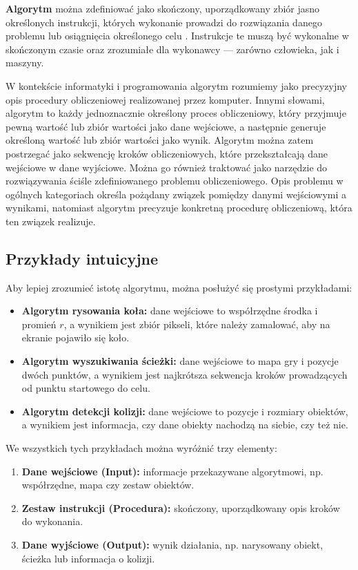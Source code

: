 \documentclass[a4paper,12pt]{book} %
\begin{document}
\textbf{Algorytm} można zdefiniować jako skończony, uporządkowany zbiór jasno określonych instrukcji, których wykonanie prowadzi do rozwiązania danego problemu lub osiągnięcia określonego celu \cite{Algorithms_introduction}. Instrukcje te muszą być wykonalne w skończonym czasie oraz zrozumiałe dla wykonawcy — zarówno człowieka, jak i maszyny.

W kontekście informatyki i programowania algorytm rozumiemy jako precyzyjny opis procedury obliczeniowej realizowanej przez komputer.
Innymi słowami, algorytm to każdy jednoznacznie określony proces obliczeniowy, który przyjmuje pewną wartość lub zbiór wartości jako dane wejściowe, a następnie generuje określoną wartość lub zbiór wartości jako wynik. Algorytm można zatem postrzegać jako sekwencję kroków obliczeniowych, które przekształcają dane wejściowe w dane wyjściowe.
Można go również traktować jako narzędzie do rozwiązywania ściśle zdefiniowanego problemu obliczeniowego. Opis problemu w ogólnych kategoriach określa pożądany związek pomiędzy danymi wejściowymi a wynikami, natomiast algorytm precyzuje konkretną procedurę obliczeniową, która ten związek realizuje.

\subsection*{Przykłady intuicyjne}

Aby lepiej zrozumieć istotę algorytmu, można posłużyć się prostymi przykładami:

\begin{itemize}
    \item \textbf{Algorytm rysowania koła:} dane wejściowe to współrzędne środka i promień $r$, a wynikiem jest zbiór pikseli, które należy zamalować, aby na ekranie pojawiło się koło.
    \item \textbf{Algorytm wyszukiwania ścieżki:} dane wejściowe to mapa gry i pozycje dwóch punktów, a wynikiem jest najkrótsza sekwencja kroków prowadzących od punktu startowego do celu.
    \item \textbf{Algorytm detekcji kolizji:} dane wejściowe to pozycje i rozmiary obiektów, a wynikiem jest informacja, czy dane obiekty nachodzą na siebie, czy też nie.
\end{itemize}

We wszystkich tych przykładach można wyróżnić trzy elementy:
\begin{enumerate}
    \item \textbf{Dane wejściowe (Input):} informacje przekazywane algorytmowi, np. współrzędne, mapa czy zestaw obiektów.
    \item \textbf{Zestaw instrukcji (Procedura):} skończony, uporządkowany opis kroków do wykonania.
    \item \textbf{Dane wyjściowe (Output):} wynik działania, np. narysowany obiekt, ścieżka lub informacja o kolizji.
\end{enumerate}
\end{document}
